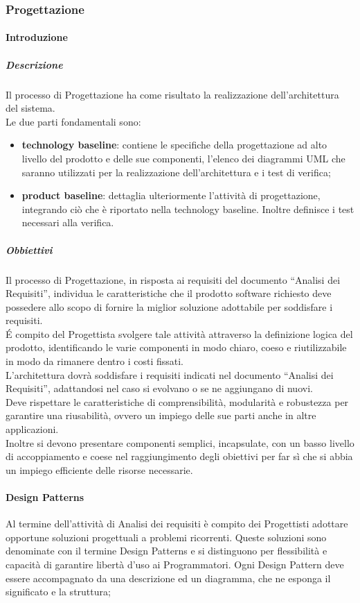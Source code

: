 \iffalse
		\subsubsection{Progettazione}
			\paragraph{Introduzione}
				\subparagraph{Descrizione}
					Il processo di Progettazione ha come risultato la realizzazione dell’architettura del sistema.\\
					Le due parti fondamentali sono:\\
					\begin{itemize}
						\item\textbf{technology baseline}: contiene le specifiche della progettazione ad alto livello del prodotto e delle sue componenti, l'elenco dei diagrammi UML che saranno utilizzati per la realizzazione dell'architettura e i test di verifica;
						\item\textbf{product baseline}: dettaglia ulteriormente l'attività di progettazione, integrando ciò che è riportato nella technology baseline. Inoltre definisce i test necessari alla verifica.
					\end{itemize}
				\subparagraph{Obbiettivi}
					Il processo di Progettazione, in risposta ai requisiti del documento “Analisi dei Requisiti”, individua le caratteristiche che il prodotto software richiesto deve possedere allo scopo di fornire la miglior soluzione adottabile per soddisfare i requisiti.\\
					É compito del Progettista svolgere tale attività attraverso la definizione logica del prodotto, identificando le varie componenti in modo chiaro, coeso e riutilizzabile in modo da rimanere dentro i costi fissati.\\
					L'architettura dovrà soddisfare i requisiti indicati nel documento “Analisi dei Requisiti”, adattandosi nel caso si evolvano o se ne aggiungano di nuovi. \\
					Deve rispettare le caratteristiche di comprensibilità, modularità e robustezza per garantire una riusabilità, ovvero un impiego delle sue parti anche in altre applicazioni. \\
					Inoltre si devono presentare componenti semplici, incapsulate, con un basso livello di accoppiamento e coese nel raggiungimento degli obiettivi per far sì che si abbia un impiego efficiente delle risorse necessarie.\\
			\paragraph{Design Patterns}
				Al termine dell’attività di Analisi dei requisiti è compito dei Progettisti adottare opportune soluzioni progettuali a problemi ricorrenti. Queste soluzioni sono denominate con il termine Design Patterns e si distinguono per flessibilità e capacità di garantire libertà d’uso ai Programmatori. Ogni Design Pattern deve essere accompagnato da una descrizione ed un diagramma, che ne esponga il significato e la struttura;\\
